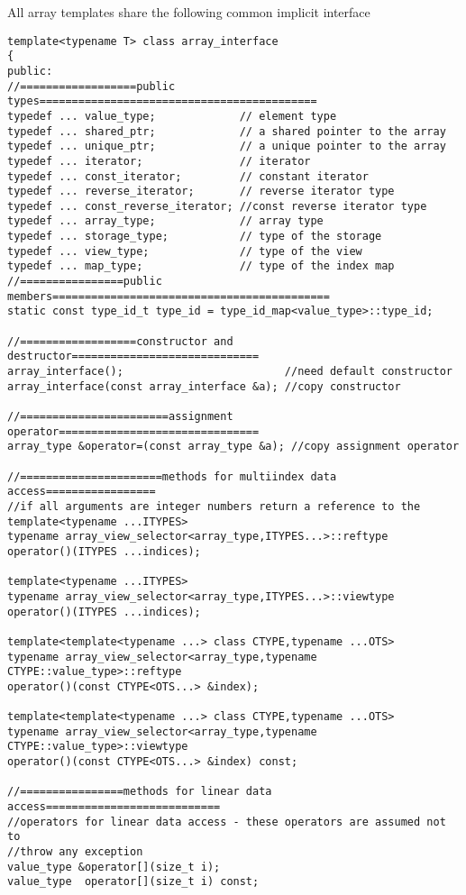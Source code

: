 All array templates share the following common implicit interface
\begin{verbatim}
template<typename T> class array_interface
{
public:
//==================public types===========================================
typedef ... value_type;             // element type
typedef ... shared_ptr;             // a shared pointer to the array
typedef ... unique_ptr;             // a unique pointer to the array
typedef ... iterator;               // iterator
typedef ... const_iterator;         // constant iterator
typedef ... reverse_iterator;       // reverse iterator type
typedef ... const_reverse_iterator; //const reverse iterator type
typedef ... array_type;             // array type
typedef ... storage_type;           // type of the storage
typedef ... view_type;              // type of the view
typedef ... map_type;               // type of the index map
//================public members===========================================
static const type_id_t type_id = type_id_map<value_type>::type_id;

//==================constructor and destructor=============================
array_interface();                         //need default constructor
array_interface(const array_interface &a); //copy constructor

//=======================assignment operator===============================
array_type &operator=(const array_type &a); //copy assignment operator

//======================methods for multiindex data access=================
//if all arguments are integer numbers return a reference to the
template<typename ...ITYPES> 
typename array_view_selector<array_type,ITYPES...>::reftype 
operator()(ITYPES ...indices);

template<typename ...ITYPES> 
typename array_view_selector<array_type,ITYPES...>::viewtype 
operator()(ITYPES ...indices);

template<template<typename ...> class CTYPE,typename ...OTS> 
typename array_view_selector<array_type,typename CTYPE::value_type>::reftype
operator()(const CTYPE<OTS...> &index);

template<template<typename ...> class CTYPE,typename ...OTS> 
typename array_view_selector<array_type,typename CTYPE::value_type>::viewtype
operator()(const CTYPE<OTS...> &index) const;

//================methods for linear data access===========================
//operators for linear data access - these operators are assumed not to
//throw any exception
value_type &operator[](size_t i);
value_type  operator[](size_t i) const;


\end{verbatim}

